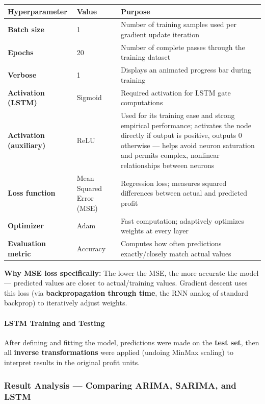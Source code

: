 \documentclass[12pt,openany]{book}
\begin{document}
\begin{center}
\begin{tabular}{|L{0.22\textwidth}|L{0.32\textwidth}|L{0.32\textwidth}|}
\hline
Hyperparameter & Value & Purpose \\
\hline
\textbf{Batch size} & 1 & Number of training samples used per gradient update iteration \\
\hline
\textbf{Epochs} & 20 & Number of complete passes through the training dataset \\
\hline
\textbf{Verbose} & 1 & Displays an animated progress bar during training \\
\hline
\textbf{Activation (LSTM)} & Sigmoid & Required activation for LSTM gate computations \\
\hline
\textbf{Activation (auxiliary)} & ReLU & Used for its training ease and strong empirical performance; activates the node directly if output is positive, outputs 0 otherwise --- helps avoid neuron saturation and permits complex, nonlinear relationships between neurons \\
\hline
\textbf{Loss function} & Mean Squared Error (MSE) & Regression loss; measures squared differences between actual and predicted profit \\
\hline
\textbf{Optimizer} & Adam & Fast computation; adaptively optimizes weights at every layer \\
\hline
\textbf{Evaluation metric} & Accuracy & Computes how often predictions exactly/closely match actual values \\
\hline
\end{tabular}
\end{center}

\textbf{Why MSE loss specifically:} The lower the MSE, the more accurate the model --- predicted values are closer to actual/training values. Gradient descent uses this loss (via \textbf{backpropagation through time}, the RNN analog of standard backprop) to iteratively adjust weights.

\paragraph{LSTM Training and Testing}

After defining and fitting the model, predictions were made on the \textbf{test set}, then all \textbf{inverse transformations} were applied (undoing MinMax scaling) to interpret results in the original profit units.

\subsubsection{Result Analysis --- Comparing ARIMA, SARIMA, and LSTM}
\end{document}

